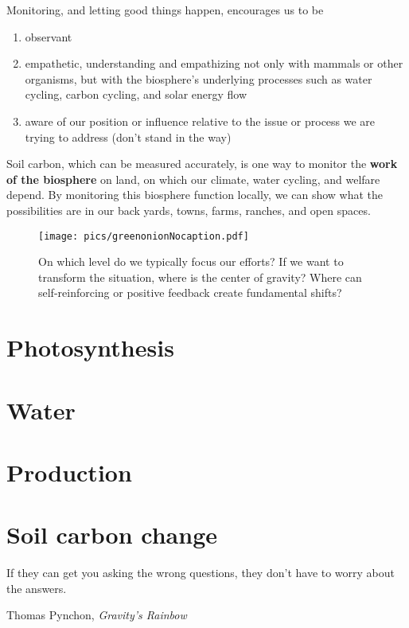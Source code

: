 \documentclass[11pt,letterpaper,oneside,onecolumn]{memoir}
\begin{document}
Monitoring, and letting good things happen, encourages us to be
\begin{enumerate}

\item observant

\item empathetic, understanding and empathizing not only with mammals or other organisms, but with the biosphere's underlying processes such as water cycling, carbon cycling, and solar energy flow

\item aware of our position or influence relative to the issue or process we are trying to address (don't stand in the way)
\end{enumerate}

Soil carbon, which can be measured accurately, is one way to monitor the \textbf{work of the biosphere} on land, on which our climate, water cycling, and welfare depend. By monitoring this biosphere function locally, we can show what the possibilities are in our back yards, towns, farms, ranches, and open spaces.

\begin{figure}
\centering
\texttt{[image: pics/greenonionNocaption.pdf]}
\caption{On which level do we typically focus our efforts? If we want to transform the situation, where is the center of gravity? Where can self-reinforcing or positive feedback create fundamental shifts?}
\end{figure}


\chapter{Photosynthesis}

\chapter{Water}


\chapter{Production}




\chapter{Soil carbon change}

\epigraph{If they can get you asking the wrong questions, they don't have to worry about the answers.}{Thomas Pynchon, \textit{Gravity's Rainbow}}
\end{document}

